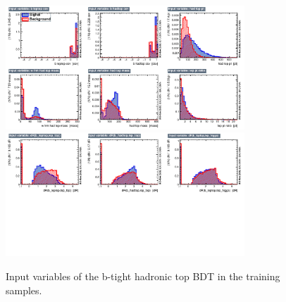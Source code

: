 
\begin{figure}[hbtp]
 \begin{center}
   \includegraphics[width=0.8\textwidth]{ch8_figs/recoBdt_btight/variables_id_c1.pdf}
   \includegraphics[width=0.8\textwidth]{ch8_figs/recoBdt_btight/variables_id_c2.pdf}
   \caption[Input variables of the b-tight hadronic top BDT]{Input variables of the b-tight hadronic top BDT in the training samples.}
   \label{fig:recoBdt_btight_inputs}
 \end{center}
\end{figure}

